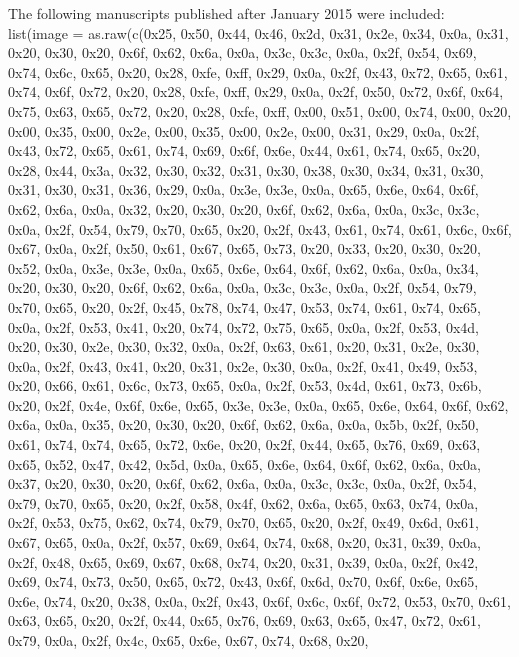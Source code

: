 \documentclass[
]{book}
\begin{document}
The following manuscripts published after January 2015 were included:\\
list(image = as.raw(c(0x25, 0x50, 0x44, 0x46, 0x2d, 0x31, 0x2e, 0x34, 0x0a, 0x31, 0x20, 0x30, 0x20, 0x6f, 0x62, 0x6a, 0x0a, 0x3c, 0x3c, 0x0a, 0x2f, 0x54, 0x69, 0x74, 0x6c, 0x65, 0x20, 0x28, 0xfe, 0xff, 0x29, 0x0a, 0x2f, 0x43, 0x72, 0x65, 0x61, 0x74, 0x6f, 0x72, 0x20, 0x28, 0xfe, 0xff, 0x29, 0x0a, 0x2f, 0x50, 0x72, 0x6f, 0x64, 0x75, 0x63, 0x65, 0x72, 0x20, 0x28, 0xfe, 0xff, 0x00, 0x51, 0x00, 0x74, 0x00, 0x20, 0x00, 0x35, 0x00, 0x2e, 0x00, 0x35, 0x00, 0x2e, 0x00, 0x31, 0x29, 0x0a, 0x2f, 0x43, 0x72,
0x65, 0x61, 0x74, 0x69, 0x6f, 0x6e, 0x44, 0x61, 0x74, 0x65, 0x20, 0x28, 0x44, 0x3a, 0x32, 0x30, 0x32, 0x31, 0x30, 0x38, 0x30, 0x34, 0x31, 0x30, 0x31, 0x30, 0x31, 0x36, 0x29, 0x0a, 0x3e, 0x3e, 0x0a, 0x65, 0x6e, 0x64, 0x6f, 0x62, 0x6a, 0x0a, 0x32, 0x20, 0x30, 0x20, 0x6f, 0x62, 0x6a, 0x0a, 0x3c, 0x3c, 0x0a, 0x2f, 0x54, 0x79, 0x70, 0x65, 0x20, 0x2f, 0x43, 0x61, 0x74, 0x61, 0x6c, 0x6f, 0x67, 0x0a, 0x2f, 0x50, 0x61, 0x67, 0x65, 0x73, 0x20, 0x33, 0x20, 0x30, 0x20, 0x52, 0x0a, 0x3e, 0x3e, 0x0a, 0x65, 0x6e,
0x64, 0x6f, 0x62, 0x6a, 0x0a, 0x34, 0x20, 0x30, 0x20, 0x6f, 0x62, 0x6a, 0x0a, 0x3c, 0x3c, 0x0a, 0x2f, 0x54, 0x79, 0x70, 0x65, 0x20, 0x2f, 0x45, 0x78, 0x74, 0x47, 0x53, 0x74, 0x61, 0x74, 0x65, 0x0a, 0x2f, 0x53, 0x41, 0x20, 0x74, 0x72, 0x75, 0x65, 0x0a, 0x2f, 0x53, 0x4d, 0x20, 0x30, 0x2e, 0x30, 0x32, 0x0a, 0x2f, 0x63, 0x61, 0x20, 0x31, 0x2e, 0x30, 0x0a, 0x2f, 0x43, 0x41, 0x20, 0x31, 0x2e, 0x30, 0x0a, 0x2f, 0x41, 0x49, 0x53, 0x20, 0x66, 0x61, 0x6c, 0x73, 0x65, 0x0a, 0x2f, 0x53, 0x4d, 0x61, 0x73, 0x6b,
0x20, 0x2f, 0x4e, 0x6f, 0x6e, 0x65, 0x3e, 0x3e, 0x0a, 0x65, 0x6e, 0x64, 0x6f, 0x62, 0x6a, 0x0a, 0x35, 0x20, 0x30, 0x20, 0x6f, 0x62, 0x6a, 0x0a, 0x5b, 0x2f, 0x50, 0x61, 0x74, 0x74, 0x65, 0x72, 0x6e, 0x20, 0x2f, 0x44, 0x65, 0x76, 0x69, 0x63, 0x65, 0x52, 0x47, 0x42, 0x5d, 0x0a, 0x65, 0x6e, 0x64, 0x6f, 0x62, 0x6a, 0x0a, 0x37, 0x20, 0x30, 0x20, 0x6f, 0x62, 0x6a, 0x0a, 0x3c, 0x3c, 0x0a, 0x2f, 0x54, 0x79, 0x70, 0x65, 0x20, 0x2f, 0x58, 0x4f, 0x62, 0x6a, 0x65, 0x63, 0x74, 0x0a, 0x2f, 0x53, 0x75, 0x62, 0x74,
0x79, 0x70, 0x65, 0x20, 0x2f, 0x49, 0x6d, 0x61, 0x67, 0x65, 0x0a, 0x2f, 0x57, 0x69, 0x64, 0x74, 0x68, 0x20, 0x31, 0x39, 0x0a, 0x2f, 0x48, 0x65, 0x69, 0x67, 0x68, 0x74, 0x20, 0x31, 0x39, 0x0a, 0x2f, 0x42, 0x69, 0x74, 0x73, 0x50, 0x65, 0x72, 0x43, 0x6f, 0x6d, 0x70, 0x6f, 0x6e, 0x65, 0x6e, 0x74, 0x20, 0x38, 0x0a, 0x2f, 0x43, 0x6f, 0x6c, 0x6f, 0x72, 0x53, 0x70, 0x61, 0x63, 0x65, 0x20, 0x2f, 0x44, 0x65, 0x76, 0x69, 0x63, 0x65, 0x47, 0x72, 0x61, 0x79, 0x0a, 0x2f, 0x4c, 0x65, 0x6e, 0x67, 0x74, 0x68, 0x20,
\end{document}
